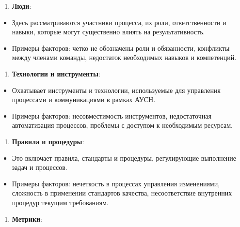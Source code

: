 \begin{multicols}{2}
\begin{enumerate}
\def\labelenumi{\arabic{enumi}.}
\setcounter{enumi}{1}
\item
  {\bfseries Люди}:
\end{enumerate}

\begin{itemize}
\item
  Здесь рассматриваются участники процесса, их роли, ответственности и
  навыки, которые могут существенно влиять на результативность.
\item
  Примеры факторов: четко не обозначены роли и обязанности, конфликты
  между членами команды, недостаток необходимых навыков и компетенций.
\end{itemize}

\begin{enumerate}
\def\labelenumi{\arabic{enumi}.}
\setcounter{enumi}{2}
\item
  {\bfseries Технологии и инструменты}:
\end{enumerate}

\begin{itemize}
\item
  Охватывает инструменты и технологии, используемые для управления
  процессами и коммуникациями в рамках АУСН.
\item
  Примеры факторов: несовместимость инструментов, недостаточная
  автоматизация процессов, проблемы с доступом к необходимым ресурсам.
\end{itemize}

\begin{enumerate}
\def\labelenumi{\arabic{enumi}.}
\setcounter{enumi}{3}
\item
  {\bfseries Правила и процедуры}:
\end{enumerate}

\begin{itemize}
\item
  Это включает правила, стандарты и процедуры, регулирующие выполнение
  задач и процессов.
\item
  Примеры факторов: нечеткость в процессах управления изменениями,
  сложность в применении стандартов качества, несоответствие внутренних
  процедур текущим требованиям.
\end{itemize}

\begin{enumerate}
\def\labelenumi{\arabic{enumi}.}
\setcounter{enumi}{4}
\item
  {\bfseries Метрики}:
\end{enumerate}


\end{multicols}
